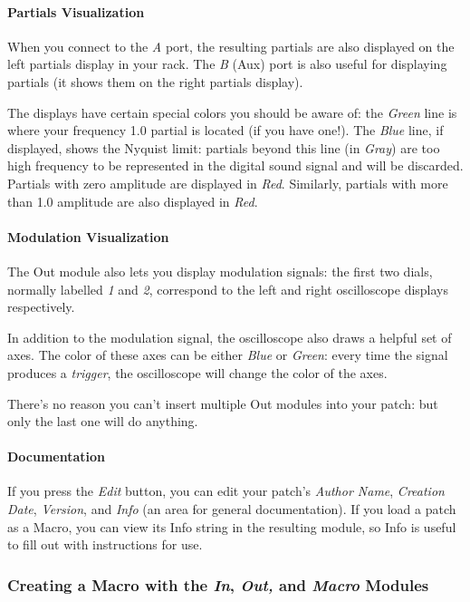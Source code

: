 \documentclass{article}
\begin{document}
\paragraph{Partials Visualization}  When you connect to the {\it A} port, the resulting partials are also displayed on the left partials display in your rack.  The {\it B} (Aux) port is also useful for displaying partials (it shows them on the right partials display).  

The displays have certain special colors you should be aware of: the {\it Green} line is where your frequency 1.0 partial is located (if you have one!).  The {\it Blue} line, if displayed, shows the Nyquist limit: partials beyond this line (in {\it Gray}) are too high frequency to be represented in the digital sound signal and will be discarded.  Partials with zero amplitude are displayed in {\it Red}.  Similarly, partials with more than 1.0 amplitude are also displayed in {\it Red}.

\paragraph{Modulation Visualization} The Out module also lets you display modulation signals: the first two dials, normally labelled {\it 1} and {\it 2}, correspond to the left and right oscilloscope displays respectively.

In addition to the modulation signal, the oscilloscope also draws a helpful set of axes.  The color of these axes can be either {\it Blue} or {\it Green}: every time the signal produces a {\it trigger}, the oscilloscope will change the color of the axes.

There's no reason you can't insert multiple Out modules into your patch: but only the last one will do anything.

\paragraph{Documentation} If you press the {\it Edit} button, you can edit your patch's {\it Author Name}, {\it Creation Date}, {\it Version}, and {\it Info} (an area for general documentation).  If you load a patch as a Macro, you can view its Info string in the resulting module, so Info is useful to fill out with instructions for use.

\subsubsection{Creating a Macro with the \textit{In}, \textit{Out,} and \textit{Macro} Modules}
\label{creatingmacros}
\end{document}
